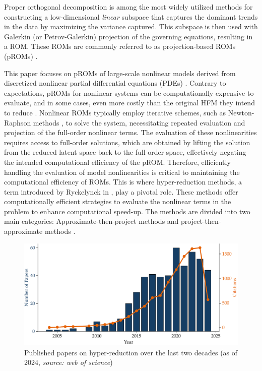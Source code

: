 \documentclass[11pt]{article}
\begin{document}
Proper orthogonal decomposition \cite{chatterjee2000introductiona,holmes1996turbulence,liang2002proper,cusumano1994experimental,feeny1998on,aubry1991on}  is among the most widely utilized methods for constructing a low-dimensional \textit{linear} subspace that captures the dominant trends in the data by maximizing the variance captured.
This subspace is then used with Galerkin (or Petrov-Galerkin) projection \cite{carlberg2011efficient,parish2020adjoint,xiao2013non-linear,chen1998petrov--galerkin,grimberg2021mesh} of the governing equations, resulting in a ROM.
These ROMs are commonly referred to as projection-based ROMs (pROMs) \cite{benner2015survey,hinze2005proper}.




This paper focuses on pROMs of large-scale nonlinear models derived from discretized nonlinear partial differential equations (PDEs) \cite{quarteroni2008numerical}.
Contrary to expectations, pROMs for nonlinear systems can be computationally expensive to evaluate, and in some cases, even more costly than the original HFM they intend to reduce \cite{farhat2014dimensional}.
Nonlinear ROMs typically employ iterative schemes, such as Newton-Raphson methods \cite{ypma1995historical}, to solve the system, necessitating repeated evaluation and projection of the full-order nonlinear terms.
The evaluation of these nonlinearities requires access to full-order solutions, which are obtained by lifting the solution from the reduced latent space back to the full-order space, effectively negating the intended computational efficiency of the pROM.
Therefore, efficiently handling the evaluation of model nonlinearities is critical to maintaining the computational efficiency of ROMs.
This is where hyper-reduction methods, a term introduced by Ryckelynck in \cite{ryckelynck2005priori}, play a pivotal role.
These methods offer computationally efficient strategies to evaluate the nonlinear terms in the problem to enhance computational speed-up.
The methods are divided into two main categories: Approximate-then-project methods and project-then-approximate methods \cite{farhat2021_5_bookchapter,grimberg2021mesh}.


\begin{figure}[t]
	    \centering
	    \includegraphics[width=\linewidth]{top10.pdf}
	    \caption{Published papers on hyper-reduction over the last two decades (as of 2024, \textit{source: web of science})}
\label{fig:papers}
\end{figure}
\end{document}
